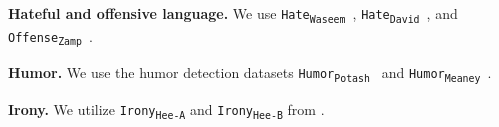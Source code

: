 \noindent\textbf{Hateful and offensive language.} We use \texttt{Hate\textsubscript{Waseem}}~\cite{waseem-2016-hateful}, \texttt{Hate\textsubscript{David}}~\cite{davidson-2017-hateoffensive}, and \texttt{Offense\textsubscript{Zamp}}~\cite{zampieri-2019-predicting}.

\noindent     \textbf{Humor.} We use the humor detection datasets \texttt{Humor\textsubscript{Potash}}~\cite{potash-2017-semeval} and \texttt{Humor\textsubscript{Meaney}}~\cite{meaney2021hahackathon}.

\noindent\textbf{Irony.} We utilize \texttt{Irony\textsubscript{Hee-A}} and  \texttt{Irony\textsubscript{Hee-B}} from \citet{van-hee2018semeval}. 
  
